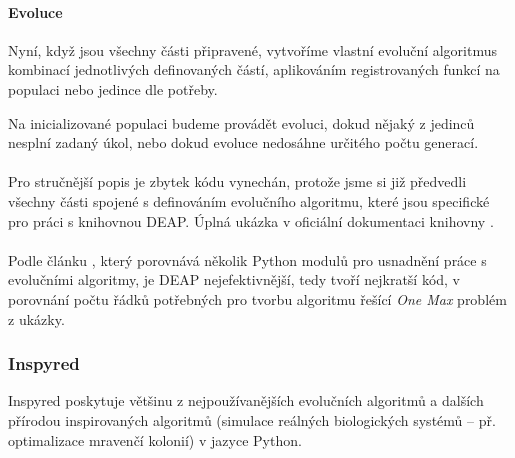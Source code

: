 \paragraph{Evoluce}
Nyní, když jsou všechny části připravené, vytvoříme vlastní evoluční algoritmus
kombinací jednotlivých definovaných částí, aplikováním registrovaných funkcí na
populaci nebo jedince dle potřeby. 

Na inicializované populaci budeme provádět evoluci, dokud nějaký z jedinců
nesplní zadaný úkol, nebo dokud evoluce nedosáhne určitého počtu generací. 

\paragraph{}
Pro stručnější popis je zbytek kódu vynechán, protože jsme si již předvedli
všechny části spojené s definováním evolučního algoritmu, které jsou specifické
pro práci s knihovnou DEAP. Úplná ukázka v oficiální dokumentaci knihovny
\citep{deapproject}.

\paragraph{}
Podle článku \citep{fortin2012deap}, který porovnává několik Python modulů pro
usnadnění práce s evolučními algoritmy, je DEAP nejefektivnější,
tedy tvoří nejkratší kód, v porovnání počtu řádků potřebných pro tvorbu
algoritmu řešící \emph{One Max} problém z ukázky.

\subsubsection{Inspyred} \label{Inspyred}

Inspyred \citep{InspyredDocs} poskytuje většinu z nejpoužívanějších evolučních algoritmů a
dalších přírodou inspirovaných algoritmů (simulace reálných
biologických systémů -- př. optimalizace mravenčí kolonií) v jazyce
Python. 

